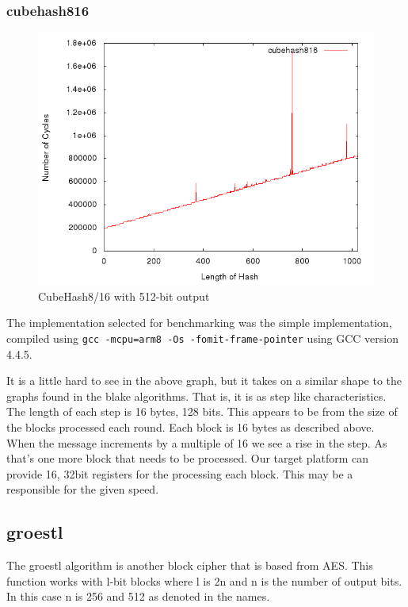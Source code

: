 \documentclass[10pt,a4paper]{article}
\begin{document}
\subsubsection{cubehash816}
    \begin{figure}[H]
        \begin{center}
            \includegraphics[scale=0.5]{images/cubehash816.png} 
            \caption{CubeHash8/16 with 512-bit output}
        \end{center}
    \end{figure}

The implementation selected for benchmarking was the simple implementation,
compiled using \texttt{gcc -mcpu=arm8 -Os -fomit-frame-pointer} using GCC
version 4.4.5.

It is a little hard to see in the above graph, but it takes on a similar shape to the graphs found in the blake algorithms. That is, it is as step like characteristics. The length of each step is 16 bytes, 128 bits. This appears to be from the size of the blocks processed each round. Each block is 16 bytes as described above. When the message increments by a multiple of 16 we see a rise in the step. As that's one more block that needs to be processed.  
Our target platform can provide 16, 32bit registers for the processing each block. This may be a responsible for the given speed.

\subsection{groestl}
The groestl algorithm is another block cipher that is based from AES. This function works with l-bit blocks where l is 2n and n is the number of output bits. In this case n is 256 and 512 as denoted in the names. 
\end{document}
